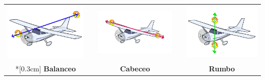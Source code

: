 \begin{center} \begin{tabular}{ccccc}
   \includegraphics[scale=0.25]{Imagenes/05_Primitivas/plane-balanceo.png} & &
     \includegraphics[scale=0.3]{Imagenes/05_Primitivas/plane-cabeceo.png} & &
       \includegraphics[scale=0.25]{Imagenes/05_Primitivas/plane-rumbo.png} \\*[0.3cm]
   \textbf{Balanceo} & & \textbf{Cabeceo} & & \textbf{Rumbo} 
\end{tabular} \end{center}

